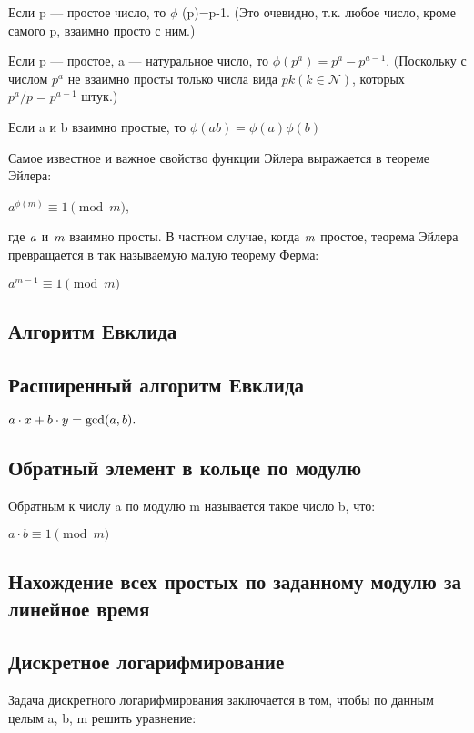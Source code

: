 \documentclass[a4paper]{article}
\begin{document}
\begin{multicols*}{2}
		Если p — простое число, то $\phi$ (p)=p-1.
		(Это очевидно, т.к. любое число, кроме самого p, взаимно просто с ним.)
		
		Если p — простое, a — натуральное число, то $\phi (p^a)=p^a-p^{a-1}$.
		(Поскольку с числом $p^a$ не взаимно просты только числа вида $pk (k \in \mathcal{N})$, которых $p^a / p = p^{a-1}$ штук.)
		
		Если a и b взаимно простые, то $\phi(ab) = \phi(a) \phi(b) $
		
		Самое известное и важное свойство функции Эйлера выражается в теореме Эйлера:
		
		$a^{\phi(m)} \equiv 1 \pmod m$, 
		
		где $\it a$ и $\it m$ взаимно просты.
		В частном случае, когда $\it m$ простое, теорема Эйлера превращается в так называемую малую теорему Ферма:
		
		$a^{m-1} \equiv 1  \pmod m $
		
		\subsection{Алгоритм Евклида}
		
		\subsection{Расширенный алгоритм Евклида}
		$a \cdot x + b \cdot y = {\rm gcd} (a, b).$
		
		\subsection{Обратный элемент в кольце по модулю}
		Обратным к числу a по модулю m называется такое число b, что:
		
		$a \cdot b \equiv 1 \pmod m$
		
		\subsection{Нахождение всех простых по заданному модулю за линейное время}
		
		\subsection{Дискретное логарифмирование}
		Задача дискретного логарифмирования заключается в том, чтобы по данным целым a, b, m решить уравнение:
		

\end{multicols*}
\end{document}
